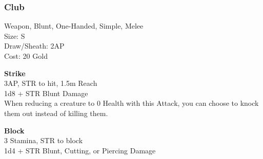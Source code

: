 \subsubsection{Club}\label{weapon:club}
Weapon, Blunt, One-Handed, Simple, Melee\\
Size: S\\
Draw/Sheath: 2AP\\
Cost: 20 Gold

\textbf{Strike}\\
3AP, STR to hit, 1.5m Reach\\
1d8 + \texttimes STR Blunt Damage\\
When reducing a creature to 0 Health with this Attack, you can choose to knock them out instead of killing them.

\textbf{Block}\\
3 Stamina, STR to block\\
1d4 + \texttimes STR Blunt, Cutting, or Piercing Damage

